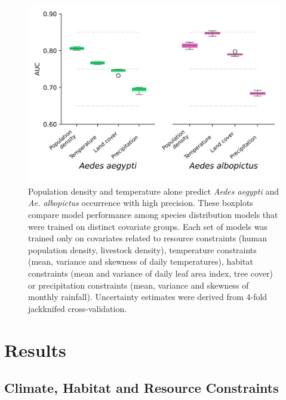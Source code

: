 \begin{figure}[!ht]
\includegraphics[width=\textwidth]{figures/ch3-importance.pdf}
\centering
\caption[Population density and temperature alone predict \textit{Aedes aegypti} and \textit{Ae. albopictus} occurrence with high precision.]{Population density and temperature alone predict \textit{Aedes aegypti} and \textit{Ae. albopictus} occurrence with high precision. These boxplots compare model performance among species distribution models that were trained on distinct covariate groups. Each set of models was trained only on covariates related to resource constraints (human population density, livestock density), temperature constraints (mean, variance and skewness of daily temperatures), habitat constraints (mean and variance of daily leaf area index, tree cover) or precipitation constraints (mean, variance and skewness of monthly rainfall). Uncertainty estimates were derived from 4-fold jackknifed cross-validation.}
\label{fig:importance}
\end{figure}

\section{Results}

\subsection{Climate, Habitat and Resource Constraints}

